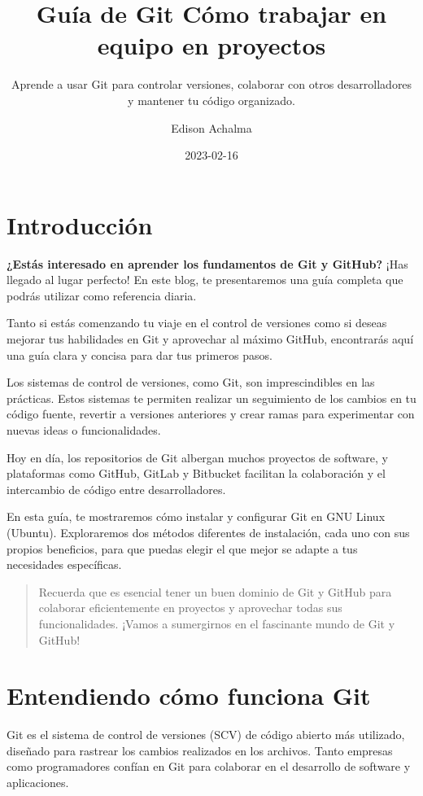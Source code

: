 \documentclass[
  a4paper,
]{article}
\title{Guía de Git Cómo trabajar en equipo en proyectos}
\subtitle{Aprende a usar Git para controlar versiones, colaborar con
otros desarrolladores y mantener tu código organizado.}
\author{Edison Achalma}
\date{2023-02-16}
\begin{document}
\maketitle

\section{Introducción}\label{introducciuxf3n}

\textbf{¿Estás interesado en aprender los fundamentos de Git y GitHub?}
¡Has llegado al lugar perfecto! En este blog, te presentaremos una guía
completa que podrás utilizar como referencia diaria.

Tanto si estás comenzando tu viaje en el control de versiones como si
deseas mejorar tus habilidades en Git y aprovechar al máximo GitHub,
encontrarás aquí una guía clara y concisa para dar tus primeros pasos.

Los sistemas de control de versiones, como Git, son imprescindibles en
las prácticas. Estos sistemas te permiten realizar un seguimiento de los
cambios en tu código fuente, revertir a versiones anteriores y crear
ramas para experimentar con nuevas ideas o funcionalidades.

Hoy en día, los repositorios de Git albergan muchos proyectos de
software, y plataformas como GitHub, GitLab y Bitbucket facilitan la
colaboración y el intercambio de código entre desarrolladores.

En esta guía, te mostraremos cómo instalar y configurar Git en GNU Linux
(Ubuntu). Exploraremos dos métodos diferentes de instalación, cada uno
con sus propios beneficios, para que puedas elegir el que mejor se
adapte a tus necesidades específicas.

\begin{quote}
Recuerda que es esencial tener un buen dominio de Git y GitHub para
colaborar eficientemente en proyectos y aprovechar todas sus
funcionalidades. ¡Vamos a sumergirnos en el fascinante mundo de Git y
GitHub!
\end{quote}

\section{Entendiendo cómo funciona
Git}\label{entendiendo-cuxf3mo-funciona-git}

Git es el sistema de control de versiones (SCV) de código abierto más
utilizado, diseñado para rastrear los cambios realizados en los
archivos. Tanto empresas como programadores confían en Git para
colaborar en el desarrollo de software y aplicaciones.
\end{document}
